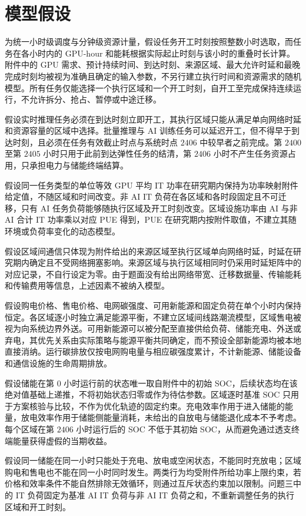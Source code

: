 \section{模型假设}

为统一小时级调度与分钟级资源计量，假设任务开工时刻按照整数小时选取，而任务在各小时内的 GPU-hour 和能耗根据实际起止时刻与该小时的重叠时长计算。附件中的 GPU 需求、预计持续时间、到达时刻、来源区域、最大允许时延和最晚完成时刻均被视为准确且确定的输入参数，不另行建立执行时间和资源需求的随机模型。所有任务仅能选择一个执行区域和一个开工时刻，自开工至完成保持连续运行，不允许拆分、抢占、暂停或中途迁移。

假设实时推理任务必须在到达时刻立即开工，其执行区域只能从满足单向网络时延和资源容量的区域中选择。批量推理与 AI 训练任务可以延迟开工，但不得早于到达时刻，且必须在任务有效截止时点与系统时点 $2406$ 中较早者之前完成。第 $2400$ 至第 $2405$ 小时只用于此前到达弹性任务的结清，第 $2406$ 小时不产生任务资源占用，只承担电力与储能终端结算。

假设同一任务类型的单位等效 GPU 平均 IT 功率在研究期内保持为功率映射附件给定值，不随区域和时间改变。非 AI IT 负荷在各区域和各时段固定且不可迁移，只有 AI 任务负荷能够随执行区域及开工时刻改变。区域设施功率由 AI 与非 AI 合计 IT 功率乘以对应 PUE 得到，PUE 在研究期内按附件取值，不建立其随环境或负荷率变化的动态模型。

假设区域间通信只体现为附件给出的来源区域至执行区域单向网络时延，时延在研究期内确定且不受网络拥塞影响。来源区域与执行区域相同时仍采用时延矩阵中的对应记录，不自行设定为零。由于题面没有给出网络带宽、迁移数据量、传输能耗和传输费用等信息，上述因素不被纳入模型。

假设购电价格、售电价格、电网碳强度、可用新能源和固定负荷在单个小时内保持恒定。各区域逐小时独立满足能源平衡，不建立区域间线路潮流模型，区域售电被视为向系统边界外送。可用新能源可以被分配至直接供给负荷、储能充电、外送或弃电，其优先关系由实际策略与能源平衡共同确定，而不预设全部新能源均被本地直接消纳。运行碳排放仅按电网购电量与相应碳强度累计，不计新能源、储能设备和通信设施的生命周期排放。

假设储能在第 $0$ 小时运行前的状态唯一取自附件中的初始 SOC，后续状态均在该绝对值基础上递推，不将初始状态归零或作为待估参数。区域逐时基准 SOC 只用于方案核验与比较，不作为优化轨迹的固定约束。充电效率作用于进入储能的能量，放电效率作用于储能侧能量消耗，未给出的自放电与储能退化成本不予考虑。每个区域在第 $2406$ 小时运行后的 SOC 不低于其初始 SOC，从而避免通过透支终端能量获得虚假的当期收益。

假设同一储能在同一小时只能处于充电、放电或空闲状态，不能同时充放电；区域购电和售电也不能在同一小时同时发生。两类行为均受附件所给功率上限约束，若价格和效率条件不能自然排除无效循环，则通过互斥状态约束加以限制。问题三中的 IT 负荷固定为基准 AI IT 负荷与非 AI IT 负荷之和，不重新调整任务的执行区域和开工时刻。


